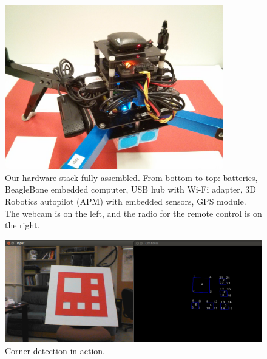 \documentclass[10pt]{scrartcl} %
\begin{document}
\begin{figure}[h!]
\centering
\includegraphics[width=0.85\textwidth]{images/hardware.jpg}
\caption{
    Our hardware stack fully assembled. From bottom to top: batteries,
    BeagleBone embedded computer, USB hub with Wi-Fi adapter, 3D
    Robotics autopilot (APM) with embedded sensors, GPS module. The
    webcam is on the left, and the radio for the remote control is on
    the right.
}
\label{fig:hardware-photo}
\end{figure}

\begin{figure}[h]
    \centering
    \includegraphics[width=\textwidth]{images/corners.png}
    \caption{Corner detection in action.}
    \label{fig:corners}
\end{figure}
\end{document}
